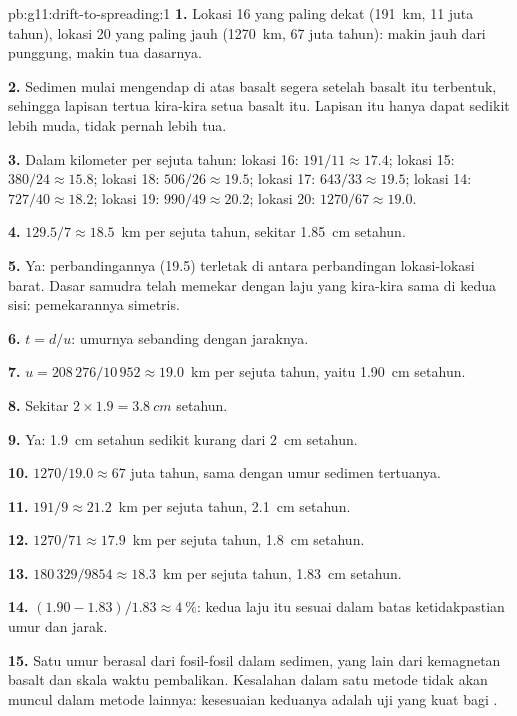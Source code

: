 \begin{solution}{pb:g11:drift-to-spreading:1}
\textbf{1.} Lokasi 16 yang paling dekat (\qty{191}{km}, 11 juta tahun), lokasi
20 yang paling jauh (\qty{1270}{km}, 67 juta tahun): makin jauh dari punggung,
makin tua dasarnya.

\textbf{2.} Sedimen mulai mengendap di atas basalt segera setelah basalt itu
terbentuk, sehingga lapisan tertua kira-kira setua basalt itu. Lapisan itu
hanya dapat sedikit lebih muda, tidak pernah lebih tua.

\textbf{3.} Dalam kilometer per sejuta tahun: lokasi 16: $191/11 \approx 17.4$;
lokasi 15: $380/24 \approx 15.8$; lokasi 18: $506/26 \approx 19.5$; lokasi 17:
$643/33 \approx 19.5$; lokasi 14: $727/40 \approx 18.2$; lokasi 19: $990/49
\approx 20.2$; lokasi 20: $1270/67 \approx 19.0$.

\textbf{4.} $129.5/7 \approx \num{18.5}$~km per sejuta tahun, sekitar
\qty{1.85}{cm} setahun.

\textbf{5.} Ya: perbandingannya (19.5) terletak di antara perbandingan
lokasi-lokasi barat. Dasar samudra telah memekar dengan laju yang kira-kira
sama di kedua sisi: pemekarannya simetris.

\textbf{6.} $t = d/u$: umurnya sebanding dengan jaraknya.

\textbf{7.} $u = 208\,276/10\,952 \approx \num{19.0}$~km per sejuta tahun,
yaitu \qty{1.90}{cm} setahun.

\textbf{8.} Sekitar $2 \times 1.9 = \qty{3.8}{cm}$ setahun.

\textbf{9.} Ya: \qty{1.9}{cm} setahun sedikit kurang dari \qty{2}{cm}
setahun.

\textbf{10.} $1270/19.0 \approx 67$ juta tahun, sama dengan umur sedimen
tertuanya.

\textbf{11.} $191/9 \approx \num{21.2}$~km per sejuta tahun,
\qty{2.1}{cm} setahun.

\textbf{12.} $1270/71 \approx \num{17.9}$~km per sejuta tahun,
\qty{1.8}{cm} setahun.

\textbf{13.} $180\,329/9854 \approx \num{18.3}$~km per sejuta tahun,
\qty{1.83}{cm} setahun.

\textbf{14.} $(1.90 - 1.83)/1.83 \approx \qty{4}{\percent}$: kedua laju itu
sesuai dalam batas ketidakpastian umur dan jarak.

\textbf{15.} Satu umur berasal dari fosil-fosil dalam sedimen, yang lain dari
kemagnetan basalt dan skala waktu pembalikan. Kesalahan dalam satu metode
tidak akan muncul dalam metode lainnya: kesesuaian keduanya adalah uji yang
kuat bagi .


\end{solution}
